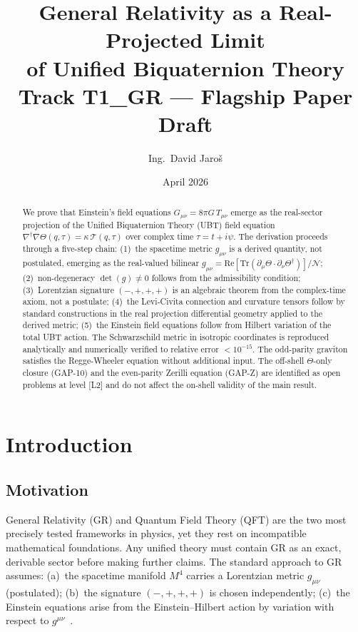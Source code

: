 \documentclass[12pt,a4paper]{article}
\title{\textbf{General Relativity as a Real-Projected Limit\\
       of Unified Biquaternion Theory}\\[8pt]
  \large Track T1\_GR — Flagship Paper Draft}
\author{Ing.\ David Jaroš}
\date{April 2026}
\theoremstyle{definition}
\theoremstyle{remark}
\newcommand{\Tr}{\mathrm{Tr}}
\newcommand{\re}{\mathrm{Re}}
\newcommand{\calN}{\mathcal{N}}
\begin{document}
\maketitle

\begin{abstract}
We prove that Einstein's field equations $G_{\mu\nu} = 8\pi G\,T_{\mu\nu}$
emerge as the real-sector projection of the Unified Biquaternion Theory (UBT)
field equation
$\nabla^\dagger\nabla\Theta(q,\tau) = \kappa\,\mathcal{T}(q,\tau)$
over complex time $\tau = t + i\psi$.
The derivation proceeds through a five-step chain:
(1)~the spacetime metric $g_{\mu\nu}$ is a derived quantity, not postulated,
emerging as the real-valued bilinear
$g_{\mu\nu} = \re[\Tr(\partial_\mu\Theta \cdot \partial_\nu\Theta^\dagger)]/\calN$;
(2)~non-degeneracy $\det(g) \neq 0$ follows from the admissibility condition;
(3)~Lorentzian signature $(-,+,+,+)$ is an algebraic theorem from the
complex-time axiom, not a postulate;
(4)~the Levi-Civita connection and curvature tensors follow by standard constructions in the real projection
differential geometry applied to the derived metric;
(5)~the Einstein field equations follow from Hilbert variation of the total
UBT action.
The Schwarzschild metric in isotropic coordinates is reproduced analytically
and numerically verified to relative error $< 10^{-15}$.
The odd-parity graviton satisfies the Regge-Wheeler equation without
additional input.
The off-shell $\Theta$-only closure (GAP-10) and the even-parity Zerilli
equation (GAP-Z) are identified as open problems at level [L2] and do not
affect the on-shell validity of the main result.
\end{abstract}

\tableofcontents
\bigskip\bigskip

\section{Introduction}
\label{sec:intro}

\subsection{Motivation}

General Relativity (GR) and Quantum Field Theory (QFT) are the two most
precisely tested frameworks in physics, yet they rest on incompatible
mathematical foundations.
Any unified theory must contain GR as an exact, derivable sector before
making further claims.
The standard approach to GR assumes:
(a)~the spacetime manifold $M^4$ carries a Lorentzian metric $g_{\mu\nu}$
(postulated);
(b)~the signature $(-,+,+,+)$ is chosen independently;
(c)~the Einstein equations arise from the Einstein--Hilbert action by
variation with respect to $g^{\mu\nu}$~\cite{einstein1915,hilbert1915}.
\end{document}

